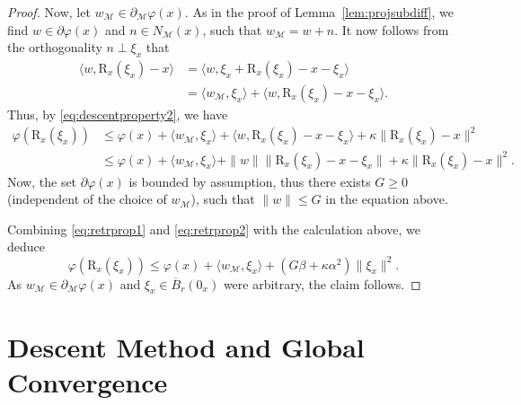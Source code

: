 \documentclass[a4paper, 12pt]{article}
\numberwithin{equation}{section}
\theoremstyle{bolddef}
\theoremstyle{definition}
\theoremstyle{boldplain}
\newcommand{\clball}{\overline{B}}
\newcommand{\retr}{\mathrm{R}}
\begin{document}
\begin{proof}
	Now, let $w_\mathcal{M} \in \partial_\mathcal{M} \varphi(x)$. As in the proof of Lemma~\ref{lem:projsubdiff}, we find $w \in \partial \varphi(x)$ and $n \in N_\mathcal{M}(x)$, such that $w_\mathcal{M} = w+n$. It now follows from the orthogonality $n \perp \xi_x$ that
	\begin{align*}
		\langle w, \retr_x(\xi_x) - x\rangle &= \langle w, \xi_x + \retr_x(\xi_x) - x - \xi_x\rangle\\
			&= \langle w_\mathcal{M}, \xi_x\rangle + \langle w, \retr_x(\xi_x) - x - \xi_x\rangle.
	\end{align*}
	Thus, by \eqref{eq:descentproperty2}, we have
	\begin{align*}
		\varphi(\retr_x(\xi_x)) &\leq \varphi(x) + \langle w_\mathcal{M}, \xi_x \rangle + \langle w, \retr_x(\xi_x) - x - \xi_x\rangle + \kappa \|\retr_x(\xi_x) - x\|^2\\
			&\leq \varphi(x) + \langle w_\mathcal{M}, \xi_x \rangle + \|w\| \|\retr_x(\xi_x) - x - \xi_x\| + \kappa \|\retr_x(\xi_x) - x\|^2.
	\end{align*}
	Now, the set $\partial \varphi(x)$ is bounded by assumption, thus there exists $G\geq 0$ (independent of the choice of $w_\mathcal{M}$), such that $\|w\|\leq G$ in the equation above.

	Combining \eqref{eq:retrprop1} and \eqref{eq:retrprop2} with the calculation above, we deduce
	\begin{equation*}
		\varphi(\retr_x(\xi_x)) \leq \varphi(x) + \langle w_\mathcal{M}, \xi_x \rangle + (G\beta + \kappa \alpha^2) \|\xi_x\|^2.
	\end{equation*}
	As $w_\mathcal{M} \in \partial_\mathcal{M} \varphi(x)$ and $\xi_x \in \clball_r(0_x)$ were arbitrary, the claim follows.
\end{proof}

\section{Descent Method and Global Convergence}\label{Sec:Algorithm}
\end{document}
